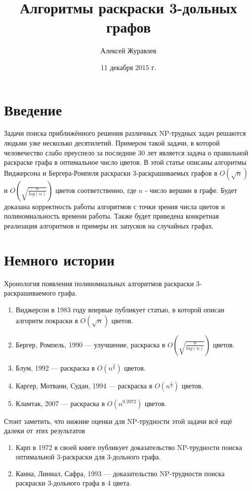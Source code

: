 \documentclass{article}
\title{Алгоритмы раскраски 3-дольных графов}
\author{Алексей Журавлев}
\date{11 декабря 2015 г.}
\begin{document}
\maketitle

\section{Введение}

Задачи поиска приближённого решения различных NP-трудных задач решаются людьми уже несколько десятилетий. 
Примером такой задачи, в которой человечество слабо преуспело за последние 30 лет является задача о правильной раскраске графа в оптимальное число цветов.
В этой статье описаны алгоритмы Виджерсона и Бергера-Ромпеля раскраски 3-раскрашиваемых графов в $O(\sqrt{n})$ и $O(\sqrt{\frac{n}{log(n)}})$ цветов соответственно, где $n$ - число вершин в графе.
Будет доказана корректность работы алгоритмов с точки зрения числа цветов и полиномиальность времени работы.
Также будет приведена конкретная реализация алгоритмов и примеры их запусков на случайных графах.

\section{Немного истории}

Хронология появления полиномиальных алгоритмов раскраски 3-раскрашиваемого графа.

\begin{enumerate}
\item Виджерсон в 1983 году впервые публикует статью, в которой описан алгоритм покраски в $O(\sqrt{n})$ цветов.
\item Бергер, Ромпель, 1990 --- улучшение, раскраска в $O(\sqrt{\frac{n}{log(n)}})$ цветов.
\item Блум, 1992 --- раскраска в $O(n^{\frac{3}{8}})$ цветов.
\item Каргер, Мотвани, Судан, 1994 --- раскраска в $O(n^{\frac{1}{4}})$ цветов.
\item Кламтак, 2007 --- раскраска в $O(n^{0.2072})$ цветов.
\end{enumerate}

Стоит заметить, что нижние оценки для NP-трудности этой задачи всё ещё далеки от этих результатов

\begin{enumerate}
\item Карп в 1972 в своей книге публикует доказательство NP-трудности поиска оптимальной 3-раскраски для 3-дольного графа.
\item Канна, Линиал, Сафра, 1993 --- доказательство NP-трудности поиска раскраски 3-дольного графа в 4 цвета.
\end{enumerate}
\end{document}
